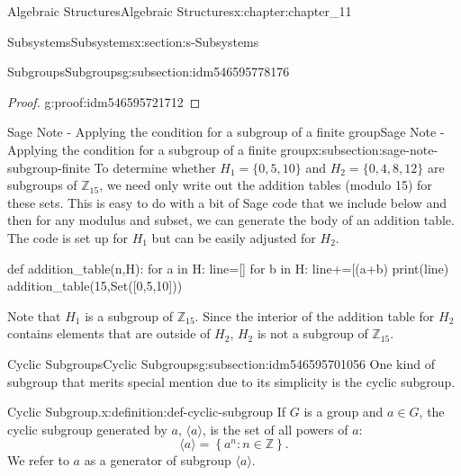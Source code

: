 \documentclass[oneside,10pt,]{book}
\numberwithin{equation}{section}
\begin{document}
\begin{chapterptx}{Algebraic Structures}{}{Algebraic Structures}{}{}{x:chapter:chapter_11}
\begin{sectionptx}{Subsystems}{}{Subsystems}{}{}{x:section:s-Subsystems}
\begin{subsectionptx}{Subgroups}{}{Subgroups}{}{}{g:subsection:idm546595778176}
\begin{proof}{}{g:proof:idm546595721712}
\end{proof}
\end{subsectionptx}
%
%
\typeout{************************************************}
\typeout{************************************************}
%
\begin{subsectionptx}{Sage Note - Applying the condition for a subgroup of a finite group}{}{Sage Note - Applying the condition for a subgroup of a finite group}{}{}{x:subsection:sage-note-subgroup-finite}
To determine whether \(H_1= \{0, 5, 10\}\) and \(H_2 = \{0, 4, 8, 12\}\) are subgroups of \(\mathbb{Z}_{15}\), we need only write out the addition tables (modulo 15) for these sets.  This is easy to do with a bit of Sage code that we include below and then for any modulus and subset, we can generate the body of an addition table.   The code is set up for \(H_1\) but can be easily adjusted for \(H_2\).%
\begin{sageinput}
def addition_table(n,H):
    for a in H:
        line=[]
        for b in H:
            line+=[(a+b)%
        print(line)
addition_table(15,Set([0,5,10]))
\end{sageinput}
\begin{sageoutput}
[0, 10, 5]
[10, 5, 0]
[5, 0, 10]
\end{sageoutput}
Note that \(H_1\) is a subgroup of \(\mathbb{Z}_{15}\). Since the interior of the addition table for \(H_2\) contains elements that are outside of \(H_2\), \(H_2\) is not a subgroup of \(\mathbb{Z}_{15}\).%
\end{subsectionptx}
%
%
\typeout{************************************************}
\typeout{************************************************}
%
\begin{subsectionptx}{Cyclic Subgroups}{}{Cyclic Subgroups}{}{}{g:subsection:idm546595701056}
One kind of subgroup that merits special mention due to its simplicity is the cyclic subgroup.%
\begin{definition}{Cyclic Subgroup.}{x:definition:def-cyclic-subgroup}%
%
%
\label{g:notation:idm546595696624}%
If \(G\) is a group and \(a \in  G\), the cyclic subgroup generated by \(a\), \(\langle a \rangle\), is the set of all powers of \(a\):%
\begin{equation*}
\langle a \rangle = \left\{a^n: n \in  \mathbb{Z}\right\}\text{.}
\end{equation*}
We refer to \(a\) as a generator of subgroup \(\langle a \rangle\).%

\end{definition}
\end{subsectionptx}
\end{sectionptx}
\end{chapterptx}
\end{document}
